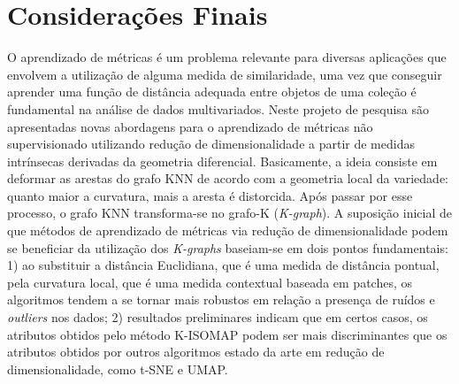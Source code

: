 \documentclass[a4paper,12pt]{article}
\begin{document}
\section{Considerações Finais}
\label{sc:finais}

O aprendizado de métricas é um problema relevante para diversas aplicações que envolvem a utilização de alguma medida de similaridade, uma vez que conseguir aprender uma função de distância adequada entre objetos de uma coleção é fundamental na análise de dados multivariados. Neste projeto de pesquisa são apresentadas novas abordagens para o aprendizado de métricas não supervisionado utilizando redução de dimensionalidade a partir de medidas intrínsecas derivadas da geometria diferencial. Basicamente, a ideia consiste em deformar as arestas do grafo KNN de acordo com a geometria local da variedade: quanto maior a curvatura, mais a aresta é distorcida. Após passar por esse processo, o grafo KNN transforma-se no grafo-K (\emph{K-graph}). A suposição inicial de que métodos de aprendizado de métricas via redução de dimensionalidade podem se beneficiar da utilização dos \emph{K-graphs} baseiam-se em dois pontos fundamentais: 1) ao substituir a distância Euclidiana, que é uma medida de distância pontual, pela curvatura local, que é uma medida contextual baseada em patches, os algoritmos tendem a se tornar mais robustos em relação a presença de ruídos e \emph{outliers} nos dados; 2) resultados preliminares indicam que em certos casos, os atributos obtidos pelo método K-ISOMAP podem ser mais discriminantes que os atributos obtidos por outros algoritmos estado da arte em redução de dimensionalidade, como t-SNE e UMAP.
\end{document}
